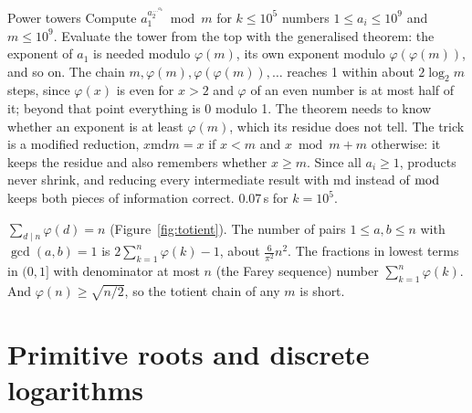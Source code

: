 \begin{problem}{Power towers}
Compute $a_1^{a_2^{\,\cdots^{a_k}}} \bmod m$ for $k \le 10^5$ numbers $1 \le a_i \le 10^9$ and $m \le 10^9$.
\solution Evaluate the tower from the top with the generalised theorem: the exponent of $a_1$ is needed modulo $\varphi(m)$, its own
exponent modulo $\varphi(\varphi(m))$, and so on. The chain $m, \varphi(m), \varphi(\varphi(m)), \dots$ reaches 1 within about $2
\log_2 m$ steps, since $\varphi(x)$ is even for $x > 2$ and $\varphi$ of an even number is at most half of it; beyond that point
everything is 0 modulo 1. The theorem needs to know whether an exponent is at least $\varphi(m)$, which its residue does not tell.
The trick is a modified reduction, $x \mathbin{\mathrm{md}} m = x$ if $x < m$ and $x \bmod m + m$ otherwise: it keeps the residue and
also remembers whether $x \ge m$. Since all $a_i \ge 1$, products never shrink, and reducing every intermediate result with
$\mathrm{md}$ instead of $\bmod$ keeps both pieces of information correct. 0.07\,s for $k = 10^5$.
\end{problem}


\begin{fact}
$\sum_{d \mid n} \varphi(d) = n$ (Figure~\ref{fig:totient}). The number of pairs $1 \le a, b \le n$ with $\gcd(a, b) = 1$ is $2
\sum_{k=1}^{n} \varphi(k) - 1$, about $\frac{6}{\pi^2} n^2$. The fractions in lowest terms in $(0, 1]$ with denominator at most $n$
(the Farey sequence) number $\sum_{k=1}^{n} \varphi(k)$. And $\varphi(n) \ge \sqrt{n/2}$, so the totient chain of any $m$ is short.
\end{fact}

\section[Primitive roots and discrete logarithms]{Primitive roots and discrete logarithms \hfill \ioi}\label{sec:dlog}

